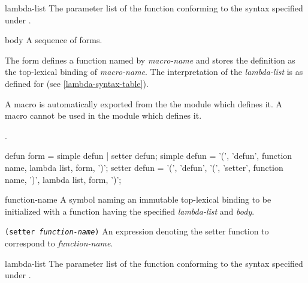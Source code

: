 \begin{optDefinition}
\begin{arguments}
    \item[lambda-list] The parameter list of the function conforming to the
    syntax specified under .

    \item[body] A sequence of forms.
\end{arguments}
%
\remarks%
The  form defines a function named by
{\em macro-name} and stores the definition as the top-lexical binding of {\em
    macro-name}.  The interpretation
of the {\em lambda-list} is as defined for  (see
\ref{lambda-syntax-table}).
%
\begin{note}
    A macro is automatically exported from the the module which defines it.  A
    macro cannot be used in the module which defines it.
\end{note}
%
\seealso%
.

%
\Syntax
\savesyntax{}\vbox{\small\syntax
defun form
   = simple defun
   | setter defun;
simple defun
   = '(', 'defun', function name, lambda list,
     {form}, ')';
setter defun
   = '(', 'defun',
          '(', 'setter', function name, ')',
          lambda list, {form}, ')';
\endsyntax}
%
\begin{arguments}
    \item[function-name] A symbol naming an immutable top-lexical binding to be
    initialized with a function having the specified {\em lambda-list} and {\em
        body}.

    \item[{\tt (setter {\em function-name})}] An expression denoting the setter
    function to correspond to {\em function-name}.

    \item[lambda-list] The parameter list of the function conforming to the
    syntax specified under .


\end{arguments}
\end{optDefinition}
